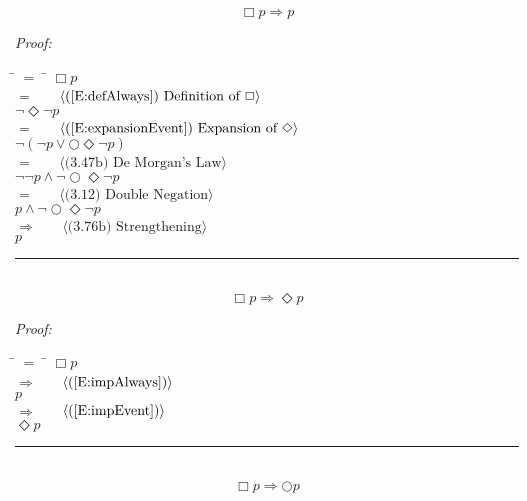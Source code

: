\documentclass[fleqn, leqno]{article}
\newcommand{\lgap}{2pt}                             %
\newcommand{\mymathindent}{24pt}                      %
\newcommand{\next}{\bigcirc}
\newcommand{\event}{\Diamond}
\newcommand{\always}{\Box}
\newcommand{\myqed}{\hfill\rule[-.23ex]{1.2ex}{2.0ex}}
\newcommand{\Gll} {\langle}                         %
\newcommand{\Ggg} {\rangle}                         %
\newcommand{\Hint}[1]     {\ \ \ $\Gll              \mbox{#1} \Ggg$ }   %
\begin{document}
\begin{equation}\label{E:impAlways}
\always p \Rightarrow p
\end{equation}

\emph{Proof:}
\begin{tabbing}
\hspace{\mymathindent} \= $= \;$ \= \kill
  \> \>   $\always p$\\[\lgap]
  \> $=$  \>  \Hint{(\ref{E:defAlways}) Definition of $\always$}\\[\lgap]
  \> \>   $\lnot\event\lnot p$\\[\lgap]
  \> $=$  \>  \Hint{(\ref{E:expansionEvent}) Expansion of $\event$}\\[\lgap]
  \> \>   $\lnot(\lnot p \lor \next\event\lnot p)$\\[\lgap]
  \> $=$  \>  \Hint{(3.47b) De Morgan's Law}\\[\lgap]
  \> \>   $\lnot\lnot p \land \lnot\next\event\lnot p$\\[\lgap]
  \> $=$  \>  \Hint{(3.12) Double Negation}\\[\lgap]
  \> \>   $p \land \lnot\next\event\lnot p$\\[\lgap]
  \> $\Rightarrow$  \>  \Hint{(3.76b) Strengthening}\\[\lgap]
  \> \>   $p$\\[\lgap]
\end{tabbing}
\myqed\\[\lgap]


\begin{equation}\label{E:impAlwaysE}
\always p \Rightarrow \event p
\end{equation}

\emph{Proof:}
\begin{tabbing}
\hspace{\mymathindent} \= $= \;$ \= \kill
  \> \>   $\always p$\\[\lgap]
  \> $\Rightarrow$  \>  \Hint{(\ref{E:impAlways})}\\[\lgap]
  \> \>   $p$\\[\lgap]
  \> $\Rightarrow$  \>  \Hint{(\ref{E:impEvent})}\\[\lgap]
  \> \>   $\event p$\\[\lgap]
\end{tabbing}
\myqed\\[\lgap]


\begin{equation}\label{E:impAlwaysN}
\always p \Rightarrow \next p
\end{equation}
\end{document}
